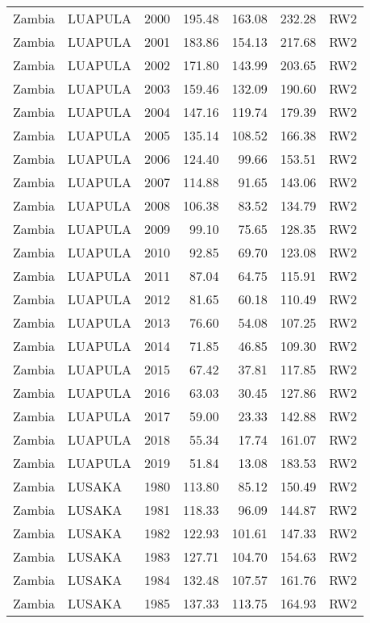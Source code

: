 \begin{longtable}{lllrrrl}
  Zambia & LUAPULA & 2000 & 195.48 & 163.08 & 232.28 & RW2 \\ 
  Zambia & LUAPULA & 2001 & 183.86 & 154.13 & 217.68 & RW2 \\ 
  Zambia & LUAPULA & 2002 & 171.80 & 143.99 & 203.65 & RW2 \\ 
  Zambia & LUAPULA & 2003 & 159.46 & 132.09 & 190.60 & RW2 \\ 
  Zambia & LUAPULA & 2004 & 147.16 & 119.74 & 179.39 & RW2 \\ 
  Zambia & LUAPULA & 2005 & 135.14 & 108.52 & 166.38 & RW2 \\ 
  Zambia & LUAPULA & 2006 & 124.40 & 99.66 & 153.51 & RW2 \\ 
  Zambia & LUAPULA & 2007 & 114.88 & 91.65 & 143.06 & RW2 \\ 
  Zambia & LUAPULA & 2008 & 106.38 & 83.52 & 134.79 & RW2 \\ 
  Zambia & LUAPULA & 2009 & 99.10 & 75.65 & 128.35 & RW2 \\ 
  Zambia & LUAPULA & 2010 & 92.85 & 69.70 & 123.08 & RW2 \\ 
  Zambia & LUAPULA & 2011 & 87.04 & 64.75 & 115.91 & RW2 \\ 
  Zambia & LUAPULA & 2012 & 81.65 & 60.18 & 110.49 & RW2 \\ 
  Zambia & LUAPULA & 2013 & 76.60 & 54.08 & 107.25 & RW2 \\ 
  Zambia & LUAPULA & 2014 & 71.85 & 46.85 & 109.30 & RW2 \\ 
  Zambia & LUAPULA & 2015 & 67.42 & 37.81 & 117.85 & RW2 \\ 
  Zambia & LUAPULA & 2016 & 63.03 & 30.45 & 127.86 & RW2 \\ 
  Zambia & LUAPULA & 2017 & 59.00 & 23.33 & 142.88 & RW2 \\ 
  Zambia & LUAPULA & 2018 & 55.34 & 17.74 & 161.07 & RW2 \\ 
  Zambia & LUAPULA & 2019 & 51.84 & 13.08 & 183.53 & RW2 \\ 
  Zambia & LUSAKA & 1980 & 113.80 & 85.12 & 150.49 & RW2 \\ 
  Zambia & LUSAKA & 1981 & 118.33 & 96.09 & 144.87 & RW2 \\ 
  Zambia & LUSAKA & 1982 & 122.93 & 101.61 & 147.33 & RW2 \\ 
  Zambia & LUSAKA & 1983 & 127.71 & 104.70 & 154.63 & RW2 \\ 
  Zambia & LUSAKA & 1984 & 132.48 & 107.57 & 161.76 & RW2 \\ 
  Zambia & LUSAKA & 1985 & 137.33 & 113.75 & 164.93 & RW2 \\ 

\end{longtable}
